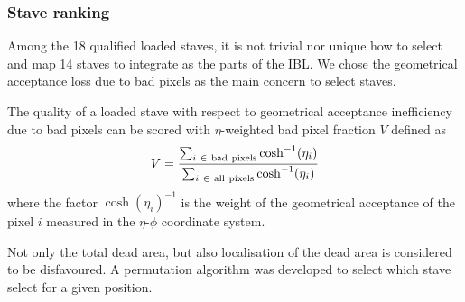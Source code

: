 \subsubsection{Stave ranking}
%
%


Among the 18 qualified loaded staves, it is not trivial nor unique how to select and map 14 staves to integrate as the parts of the IBL. We chose the geometrical acceptance loss due to bad pixels as the main concern to select staves.

The quality of a loaded stave with respect to geometrical acceptance inefficiency due to bad pixels can be scored with $\eta$-weighted bad pixel fraction $V$ defined as
\begin{eqnarray}
    V = \frac{\sum_{i~\in~{\rm bad~pixels}}\cosh^{-1}(\eta_{i})}{\sum_{i~\in~{\rm all~pixels}}\cosh^{-1}(\eta_{i})}
\end{eqnarray}
where the factor $\cosh(\eta_{i})^{-1}$ is the weight of the geometrical acceptance of the pixel $i$ measured in the $\eta$-$\phi$ coordinate system.

Not only the total dead area, but also localisation of the dead area is considered to be disfavoured. A permutation algorithm was developed to select which stave select for a given position\cite{StaveQAnote}.


